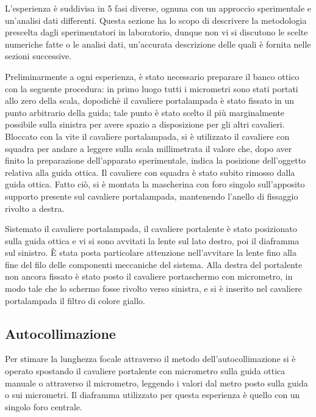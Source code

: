 L'esperienza \`e suddivisa in 5 fasi diverse, ognuna con 
un approccio sperimentale e un'analisi dati differenti. Questa 
sezione ha lo scopo di descrivere la metodologia prescelta dagli 
sperimentatori in laboratorio, dunque non vi si discutono le scelte 
numeriche fatte o le analisi dati, un'accurata descrizione delle 
quali è fornita nelle sezioni successive.

Preliminarmente a ogni esperienza, è stato necessario preparare il 
banco ottico con la seguente procedura: in primo luogo tutti i 
micrometri sono stati portati allo zero della scala, dopodichè il 
cavaliere portalampada \`e stato fissato in un punto arbitrario della 
guida; tale punto è stato scelto il più marginalmente possibile 
sulla sinistra per avere spazio a disposizione per gli altri 
cavalieri. Bloccato con la vite il cavaliere portalampada, si 
\`e utilizzato il cavaliere con squadra per andare a leggere sulla scala 
millimetrata il valore che, dopo aver finito la preparazione 
dell'apparato sperimentale, indica la posizione 
dell'oggetto relativa alla guida ottica. Il cavaliere con squadra \`e stato subito
 rimosso dalla guida ottica. Fatto ciò, si \`e montata la 
mascherina con foro singolo sull'apposito supporto presente sul 
cavaliere portalampada, mantenendo l'anello di fissaggio rivolto a 
destra.

Sistemato il cavaliere portalampada, il cavaliere 
portalente \`e stato posizionato sulla guida ottica e vi si sono avvitati la 
lente sul lato destro, poi il diaframma sul sinistro. \`E stata posta 
particolare attenzione nell'avvitare la lente fino alla fine del 
filo delle componenti meccaniche del sistema. Alla destra del 
portalente non ancora fissato \`e stato posto il cavaliere portaschermo con 
micrometro, in modo tale che lo schermo fosse rivolto verso sinistra, 
e si \`e inserito nel cavaliere portalampada il filtro di colore giallo.

\subsection{Autocollimazione}
Per stimare la lunghezza focale attraverso il metodo 
dell'autocollimazione si è operato spostando il cavaliere portalente 
con micrometro sulla guida ottica manuale o attraverso il 
micrometro, leggendo i valori dal metro posto sulla guida 
o sui micrometri. Il diaframma utilizzato per questa esperienza è 
quello con un singolo foro centrale. 


